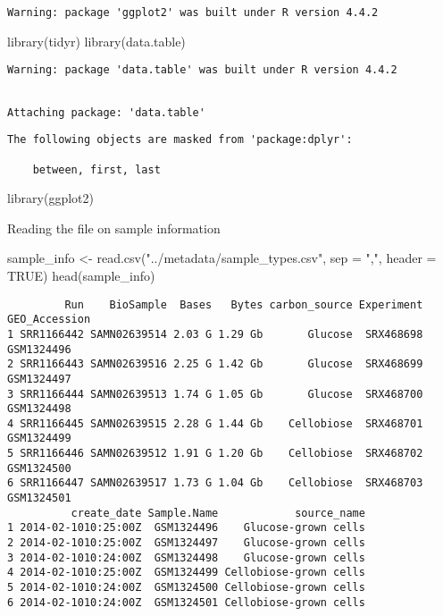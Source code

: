 \documentclass[
  letterpaper,
  DIV=11,
  numbers=noendperiod]{scrartcl}
\newenvironment{Shaded}{\begin{snugshade}}{\end{snugshade}}
\newcommand{\AttributeTok}[1]{\textcolor[rgb]{0.40,0.45,0.13}{#1}}
\newcommand{\ConstantTok}[1]{\textcolor[rgb]{0.56,0.35,0.01}{#1}}
\newcommand{\FunctionTok}[1]{\textcolor[rgb]{0.28,0.35,0.67}{#1}}
\newcommand{\NormalTok}[1]{\textcolor[rgb]{0.00,0.23,0.31}{#1}}
\newcommand{\OtherTok}[1]{\textcolor[rgb]{0.00,0.23,0.31}{#1}}
\newcommand{\StringTok}[1]{\textcolor[rgb]{0.13,0.47,0.30}{#1}}
\begin{document}
\begin{verbatim}
Warning: package 'ggplot2' was built under R version 4.4.2
\end{verbatim}

\begin{Shaded}
\begin{Highlighting}[]
\FunctionTok{library}\NormalTok{(tidyr)}
\FunctionTok{library}\NormalTok{(data.table)}
\end{Highlighting}
\end{Shaded}

\begin{verbatim}
Warning: package 'data.table' was built under R version 4.4.2
\end{verbatim}

\begin{verbatim}

Attaching package: 'data.table'
\end{verbatim}

\begin{verbatim}
The following objects are masked from 'package:dplyr':

    between, first, last
\end{verbatim}

\begin{Shaded}
\begin{Highlighting}[]
\FunctionTok{library}\NormalTok{(ggplot2)}
\end{Highlighting}
\end{Shaded}

Reading the file on sample information

\begin{Shaded}
\begin{Highlighting}[]
\NormalTok{sample\_info }\OtherTok{\textless{}{-}} \FunctionTok{read.csv}\NormalTok{(}\StringTok{"../metadata/sample\_types.csv"}\NormalTok{, }\AttributeTok{sep =} \StringTok{","}\NormalTok{, }\AttributeTok{header =} \ConstantTok{TRUE}\NormalTok{)}
\FunctionTok{head}\NormalTok{(sample\_info)}
\end{Highlighting}
\end{Shaded}

\begin{verbatim}
         Run    BioSample  Bases   Bytes carbon_source Experiment GEO_Accession
1 SRR1166442 SAMN02639514 2.03 G 1.29 Gb       Glucose  SRX468698    GSM1324496
2 SRR1166443 SAMN02639516 2.25 G 1.42 Gb       Glucose  SRX468699    GSM1324497
3 SRR1166444 SAMN02639513 1.74 G 1.05 Gb       Glucose  SRX468700    GSM1324498
4 SRR1166445 SAMN02639515 2.28 G 1.44 Gb    Cellobiose  SRX468701    GSM1324499
5 SRR1166446 SAMN02639512 1.91 G 1.20 Gb    Cellobiose  SRX468702    GSM1324500
6 SRR1166447 SAMN02639517 1.73 G 1.04 Gb    Cellobiose  SRX468703    GSM1324501
          create_date Sample.Name            source_name
1 2014-02-1010:25:00Z  GSM1324496    Glucose-grown cells
2 2014-02-1010:25:00Z  GSM1324497    Glucose-grown cells
3 2014-02-1010:24:00Z  GSM1324498    Glucose-grown cells
4 2014-02-1010:25:00Z  GSM1324499 Cellobiose-grown cells
5 2014-02-1010:24:00Z  GSM1324500 Cellobiose-grown cells
6 2014-02-1010:24:00Z  GSM1324501 Cellobiose-grown cells
\end{verbatim}
\end{document}
